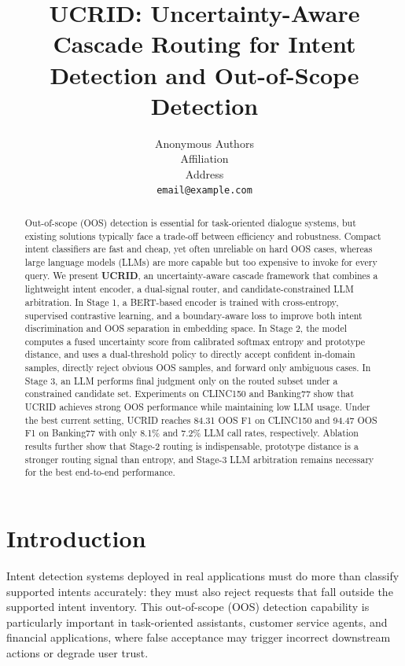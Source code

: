 \documentclass[11pt]{article}
\title{UCRID: Uncertainty-Aware Cascade Routing for Intent Detection and Out-of-Scope Detection}
\author{
Anonymous Authors \\
Affiliation \\
Address \\
\texttt{email@example.com}
}
\begin{document}
\maketitle

\begin{abstract}
Out-of-scope (OOS) detection is essential for task-oriented dialogue systems, but existing solutions typically face a trade-off between efficiency and robustness. Compact intent classifiers are fast and cheap, yet often unreliable on hard OOS cases, whereas large language models (LLMs) are more capable but too expensive to invoke for every query. We present \textbf{UCRID}, an uncertainty-aware cascade framework that combines a lightweight intent encoder, a dual-signal router, and candidate-constrained LLM arbitration. In Stage 1, a BERT-based encoder is trained with cross-entropy, supervised contrastive learning, and a boundary-aware loss to improve both intent discrimination and OOS separation in embedding space. In Stage 2, the model computes a fused uncertainty score from calibrated softmax entropy and prototype distance, and uses a dual-threshold policy to directly accept confident in-domain samples, directly reject obvious OOS samples, and forward only ambiguous cases. In Stage 3, an LLM performs final judgment only on the routed subset under a constrained candidate set. Experiments on CLINC150 and Banking77 show that UCRID achieves strong OOS performance while maintaining low LLM usage. Under the best current setting, UCRID reaches 84.31 OOS F1 on CLINC150 and 94.47 OOS F1 on Banking77 with only 8.1\% and 7.2\% LLM call rates, respectively. Ablation results further show that Stage-2 routing is indispensable, prototype distance is a stronger routing signal than entropy, and Stage-3 LLM arbitration remains necessary for the best end-to-end performance.
\end{abstract}

\section{Introduction}
Intent detection systems deployed in real applications must do more than classify supported intents accurately: they must also reject requests that fall outside the supported intent inventory. This out-of-scope (OOS) detection capability is particularly important in task-oriented assistants, customer service agents, and financial applications, where false acceptance may trigger incorrect downstream actions or degrade user trust.
\end{document}
